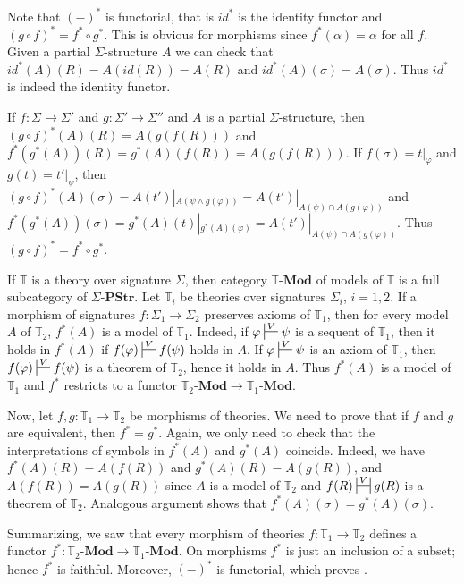 \documentclass{amsart}
\theoremstyle{definition}
\theoremstyle{remark}
\newcommand{\cat}[1]{\mathbf{#1}}
\newcommand{\PStr}[1]{#1\text{-}\cat{PStr}}
\newcommand{\Mod}[1]{#1\text{-}\cat{Mod}}
\numberwithin{figure}{section}
\begin{document}
Note that $(-)^*$ is functorial, that is $id^*$ is the identity functor and $(g \circ f)^* = f^* \circ g^*$.
This is obvious for morphisms since $f^*(\alpha) = \alpha$ for all $f$.
Given a partial $\Sigma$-structure $A$ we can check that $id^*(A)(R) = A(id(R)) = A(R)$ and $id^*(A)(\sigma) = A(\sigma)$.
Thus $id^*$ is indeed the identity functor.

If $f : \Sigma \to \Sigma'$ and $g : \Sigma' \to \Sigma''$ and $A$ is a partial $\Sigma$-structure,
then $(g \circ f)^*(A)(R) = A(g(f(R)))$ and $f^*(g^*(A))(R) = g^*(A)(f(R)) = A(g(f(R)))$.
If $f(\sigma) = t|_\varphi$ and $g(t) = t'|_\psi$, then $(g \circ f)^*(A)(\sigma) = A(t')|_{A(\psi \land g(\varphi))} = A(t')|_{A(\psi) \cap A(g(\varphi))}$
and $f^*(g^*(A))(\sigma) = g^*(A)(t)|_{g^*(A)(\varphi)} = A(t')|_{A(\psi) \cap A(g(\varphi))}$.
Thus $(g \circ f)^* = f^* \circ g^*$.

If $\mathbb{T}$ is a theory over signature $\Sigma$, then category $\Mod{\mathbb{T}}$ of models of $\mathbb{T}$ is a full subcategory of $\PStr{\Sigma}$.
Let $\mathbb{T}_i$ be theories over signatures $\Sigma_i$, $i = 1,2$.
If a morphism of signatures $f : \Sigma_1 \to \Sigma_2$ preserves axioms of $\mathbb{T}_1$, then for every model $A$ of $\mathbb{T}_2$, $f^*(A)$ is a model of $\mathbb{T}_1$.
Indeed, if $\varphi \sststile{}{V} \psi$ is a sequent of $\mathbb{T}_1$, then it holds in $f^*(A)$ if $f(\varphi) \sststile{}{V} f(\psi)$ holds in $A$.
If $\varphi \sststile{}{V} \psi$ is an axiom of $\mathbb{T}_1$, then $f(\varphi) \sststile{}{V} f(\psi)$ is a theorem of $\mathbb{T}_2$, hence it holds in $A$.
Thus $f^*(A)$ is a model of $\mathbb{T}_1$ and $f^*$ restricts to a functor $\Mod{\mathbb{T}_2} \to \Mod{\mathbb{T}_1}$.

Now, let $f,g : \mathbb{T}_1 \to \mathbb{T}_2$ be morphisms of theories.
We need to prove that if $f$ and $g$ are equivalent, then $f^* = g^*$.
Again, we only need to check that the interpretations of symbols in $f^*(A)$ and $g^*(A)$ coincide.
Indeed, we have $f^*(A)(R) = A(f(R))$ and $g^*(A)(R) = A(g(R))$, and $A(f(R)) = A(g(R))$ since $A$ is a model of $\mathbb{T}_2$ and $f(R) \ssststile{}{V} g(R)$ is a theorem of $\mathbb{T}_2$.
Analogous argument shows that $f^*(A)(\sigma) = g^*(A)(\sigma)$.

Summarizing, we saw that every morphism of theories $f : \mathbb{T}_1 \to \mathbb{T}_2$ defines a functor $f^* : \Mod{\mathbb{T}_2} \to \Mod{\mathbb{T}_1}$.
On morphisms $f^*$ is just an inclusion of a subset; hence $f^*$ is faithful.
Moreover, $(-)^*$ is functorial, which proves .
\end{document}
